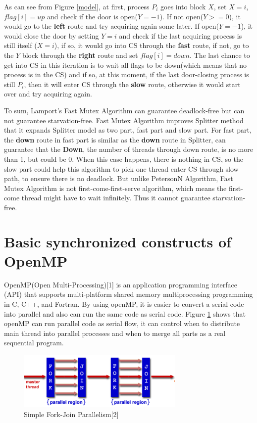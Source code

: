 \documentclass[twoside]{article}
\renewcommand{\cite}[1]{[#1]}
\begin{document}
As can see from Figure \ref{model}, at first, process $P_i$ goes into block $X$, set $X = i$, $flag[i] = up$ and check if the door is open($Y=-1$). If not open($Y>=0$), it would go to the \textbf{left} route and try acquiring again some later. If open($Y=-1$), it would close the door by setting $Y = i$ and check if the last acquiring process is still itself ($X=i$), if so, it would go into CS through the \textbf{fast} route, if not, go to the $Y$ block through the \textbf{right} route and set $flag[i] = down$. The last chance to get into CS in this iteration is to wait all flags to be down(which means that no process is in the CS) and if so, at this moment, if the last door-closing process is still $P_i$, then it will enter CS through the \textbf{slow} route, otherwise it would start over and try acquiring again.

To sum, Lamport’s Fast Mutex Algorithm can guarantee deadlock-free but can not guarantee starvation-free. Fast Mutex Algorithm improves Splitter method that it expands Splitter model as two part, fast part and slow part. For fast part, the \textbf{down} route in fast part is similar as the \textbf{down} route in Splitter, can guarantee that the \textbf{\textbar Down\textbar }, the number of threads through down route, is no more than 1, but could be 0. When this case happens, there is nothing in CS, so the slow part could help this algorithm to pick one thread enter CS through slow path, to ensure there is no deadlock. But unlike PetersonN Algorithm, Fast Mutex Algorithm is not first-come-first-serve algorithm, which means the first-come thread might have to wait infinitely. Thus it cannot guarantee starvation-free.

\section{Basic synchronized constructs of OpenMP}

OpenMP(Open Multi-Processing)\cite{1} is an application programming interface (API) that supports multi-platform shared memory multiprocessing programming in C, C++, and Fortran. By using openMP, it is easier to convert a serial code into parallel and also can run the same code as serial code. Figure \ref{openmp} shows that openMP can run parallel code as serial flow, it can control when to distribute main thread into parallel processes and when to merge all parts as a real sequential program.

\begin{figure}[!ht]
  \centering
    \includegraphics[width=0.72\textwidth]{2.png}
  \caption{Simple Fork-Join Parallelism\cite{2}}
    \label{openmp}
\end{figure}
\end{document}
